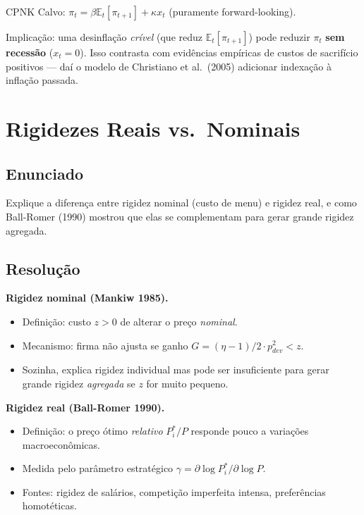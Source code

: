 \documentclass[12pt, a4paper]{article}
\newcommand{\E}{\mathbb{E}}
\begin{document}
\begin{provabox}[title={Forward-looking vs.\ backward-looking --- Para a Prova (Q4)}]
CPNK Calvo: $\pi_t = \beta\E_t[\pi_{t+1}] + \kappa x_t$ (puramente forward-looking).

Implicação: uma desinflação \emph{crível} (que reduz $\E_t[\pi_{t+1}]$) pode reduzir
$\pi_t$ \textbf{sem recessão} ($x_t = 0$). Isso contrasta com evidências empíricas de
custos de sacrifício positivos --- daí o modelo de Christiano et al.\ (2005)
adicionar indexação à inflação passada.
\end{provabox}

\section{Rigidezes Reais vs.\ Nominais}

\subsection*{Enunciado}
Explique a diferença entre rigidez nominal (custo de menu) e rigidez real, e como
Ball-Romer (1990) mostrou que elas se complementam para gerar grande rigidez agregada.

\subsection*{Resolução}

\textbf{Rigidez nominal (Mankiw 1985).}
\begin{itemize}[leftmargin=1.5em, itemsep=2pt]
  \item Definição: custo $z > 0$ de alterar o preço \emph{nominal}.
  \item Mecanismo: firma não ajusta se ganho $G = (\eta-1)/2 \cdot p_{dev}^2 < z$.
  \item Sozinha, explica rigidez individual mas pode ser insuficiente para gerar
        grande rigidez \emph{agregada} se $z$ for muito pequeno.
\end{itemize}

\textbf{Rigidez real (Ball-Romer 1990).}
\begin{itemize}[leftmargin=1.5em, itemsep=2pt]
  \item Definição: o preço ótimo \emph{relativo} $P_i^*/P$ responde pouco a variações
        macroeconômicas.
  \item Medida pelo parâmetro estratégico $\gamma = \partial\log P_i^*/\partial\log P$.
  \item Fontes: rigidez de salários, competição imperfeita intensa, preferências homotéticas.
\end{itemize}
\end{document}
